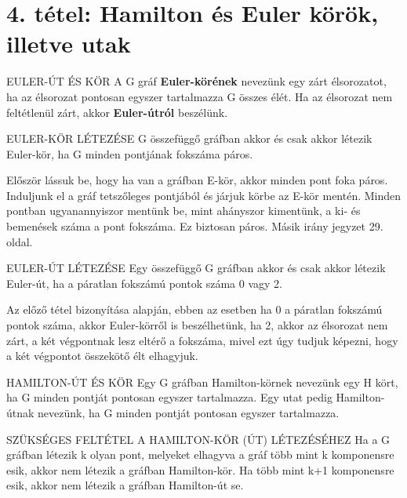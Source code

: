 \section{4. tétel: Hamilton és Euler körök, illetve utak}

\begin{definicio}{EULER-ÚT ÉS KÖR}
A G gráf \textbf{Euler-körének} nevezünk egy zárt élsorozatot, ha az élsorozat pontosan egyszer tartalmazza G összes élét. Ha az élsorozat nem feltétlenül zárt, akkor \textbf{Euler-útról} beszélünk.
\end{definicio}

\begin{tetel}{EULER-KÖR LÉTEZÉSE}
G összefüggő gráfban akkor és csak akkor létezik Euler-kör, ha G minden pontjának fokszáma páros.
\end{tetel}

\begin{bizonyitas}{}
Először lássuk be, hogy ha van a gráfban E-kör, akkor minden pont foka páros. Induljunk el a gráf tetszőleges pontjából és járjuk körbe az E-kör mentén. Minden pontban ugyanannyiszor mentünk be, mint ahányszor kimentünk, a ki- és bemenések száma a pont fokszáma. Ez biztosan páros. Másik irány jegyzet 29. oldal.%
\end{bizonyitas}

\begin{tetel}{EULER-ÚT LÉTEZÉSE}
Egy összefüggő G gráfban akkor és csak akkor létezik Euler-út, ha a páratlan fokszámú pontok száma 0 vagy 2.
\end{tetel}

\begin{bizonyitas}{}
Az előző tétel bizonyítása alapján, ebben az esetben ha 0 a páratlan fokszámú pontok száma, akkor Euler-körről is beszélhetünk, ha 2, akkor az élsorozat nem zárt, a két végpontnak lesz eltérő a fokszáma, mivel ezt úgy tudjuk képezni, hogy a két végpontot összekötő élt elhagyjuk.
\end{bizonyitas}

\begin{definicio}{HAMILTON-ÚT ÉS KÖR}
Egy G gráfban Hamilton-körnek nevezünk egy H kört, ha G minden pontját pontosan egyszer tartalmazza. Egy utat pedig Hamilton-útnak nevezünk, ha G minden pontját pontosan egyszer tartalmazza.
\end{definicio}

\begin{tetel}{SZÜKSÉGES FELTÉTEL A HAMILTON-KÖR (ÚT) LÉTEZÉSÉHEZ}
Ha a G gráfban létezik k olyan pont, melyeket elhagyva a gráf több mint k komponensre esik, akkor nem létezik a gráfban Hamilton-kör. Ha több mint k+1 komponensre esik, akkor nem létezik a gráfban Hamilton-út se.
\end{tetel}

